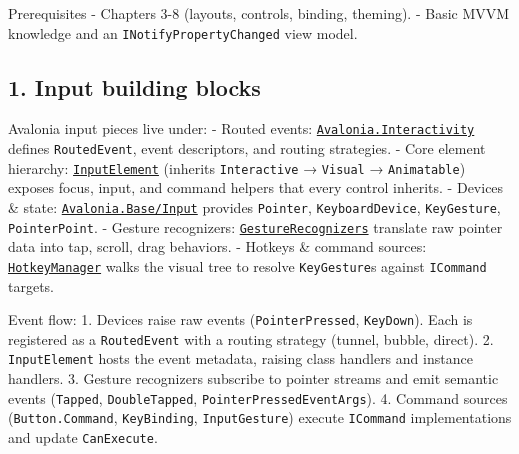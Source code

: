 Prerequisites - Chapters 3-8 (layouts, controls, binding, theming). -
Basic MVVM knowledge and an
\passthrough{\lstinline!INotifyPropertyChanged!} view model.

\subsection{1. Input building blocks}\label{input-building-blocks}

Avalonia input pieces live under: - Routed events:
\href{https://github.com/AvaloniaUI/Avalonia/tree/master/src/Avalonia.Interactivity}{\passthrough{\lstinline!Avalonia.Interactivity!}}
defines \passthrough{\lstinline!RoutedEvent!}, event descriptors, and
routing strategies. - Core element hierarchy:
\href{https://github.com/AvaloniaUI/Avalonia/blob/master/src/Avalonia.Base/Input/InputElement.cs}{\passthrough{\lstinline!InputElement!}}
(inherits \passthrough{\lstinline!Interactive!} →
\passthrough{\lstinline!Visual!} → \passthrough{\lstinline!Animatable!})
exposes focus, input, and command helpers that every control inherits. -
Devices \& state:
\href{https://github.com/AvaloniaUI/Avalonia/tree/master/src/Avalonia.Base/Input}{\passthrough{\lstinline!Avalonia.Base/Input!}}
provides \passthrough{\lstinline!Pointer!},
\passthrough{\lstinline!KeyboardDevice!},
\passthrough{\lstinline!KeyGesture!},
\passthrough{\lstinline!PointerPoint!}. - Gesture recognizers:
\href{https://github.com/AvaloniaUI/Avalonia/tree/master/src/Avalonia.Base/Input/GestureRecognizers}{\passthrough{\lstinline!GestureRecognizers!}}
translate raw pointer data into tap, scroll, drag behaviors. - Hotkeys
\& command sources:
\href{https://github.com/AvaloniaUI/Avalonia/blob/master/src/Avalonia.Controls/HotkeyManager.cs}{\passthrough{\lstinline!HotkeyManager!}}
walks the visual tree to resolve \passthrough{\lstinline!KeyGesture!}s
against \passthrough{\lstinline!ICommand!} targets.

Event flow: 1. Devices raise raw events
(\passthrough{\lstinline!PointerPressed!},
\passthrough{\lstinline!KeyDown!}). Each is registered as a
\passthrough{\lstinline!RoutedEvent!} with a routing strategy (tunnel,
bubble, direct). 2. \passthrough{\lstinline!InputElement!} hosts the
event metadata, raising class handlers and instance handlers. 3. Gesture
recognizers subscribe to pointer streams and emit semantic events
(\passthrough{\lstinline!Tapped!},
\passthrough{\lstinline!DoubleTapped!},
\passthrough{\lstinline!PointerPressedEventArgs!}). 4. Command sources
(\passthrough{\lstinline!Button.Command!},
\passthrough{\lstinline!KeyBinding!},
\passthrough{\lstinline!InputGesture!}) execute
\passthrough{\lstinline!ICommand!} implementations and update
\passthrough{\lstinline!CanExecute!}.

